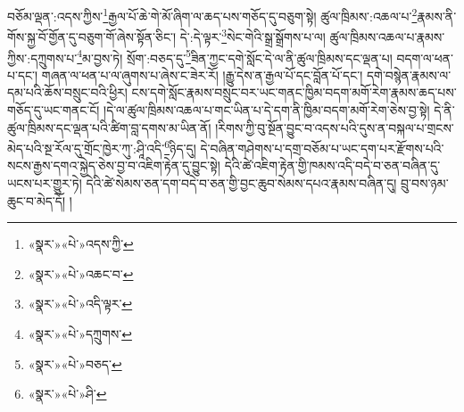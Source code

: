 བཅོམ་ལྡན་:འདས་ཀྱིས་\footnote{«སྣར་»«པེ་»འདས་ཀྱི་}རྒྱལ་པོ་ཆེ་གེ་མོ་ཞིག་ལ་ཆད་པས་གཅོད་དུ་བཅུག་སྟེ། ཚུལ་ཁྲིམས་:འཆལ་པ་\footnote{«སྣར་»«པེ་»འཆང་བ་}རྣམས་ནི་གོས་སྐྱ་བོ་གྱོན་དུ་བཅུག་གོ་ཞེས་སྟོན་ཅིང་། དེ་:དེ་ལྟར་\footnote{«སྣར་»«པེ་»འདི་ལྟར་}སེང་གེའི་སྒྲ་སྒྲོགས་པ་ལ། ཚུལ་ཁྲིམས་འཆལ་པ་རྣམས་ཀྱིས་:དཀྲུགས་པ་\footnote{«སྣར་»«པེ་»དཀྲུགས་}མ་བྱས་ཏེ། སྲོག་:བཅད་དུ་\footnote{«སྣར་»«པེ་»བཅད་}ཟིན་ཀྱང་དགེ་སློང་དེ་ལ་ནི་ཚུལ་ཁྲིམས་དང་ལྡན་པ། བདག་ལ་ཕན་པ་དང་། གཞན་ལ་ཕན་པ་ལ་ཞུགས་པ་ཞེས་ང་ཟེར་རོ། །རྒྱུ་དེས་ན་རྒྱལ་པོ་དང་བློན་པོ་དང་། དགེ་བསྙེན་རྣམས་ལ་དམ་པའི་ཆོས་བསྲུང་བའི་ཕྱིར། ངས་དགེ་སློང་རྣམས་བསྲུང་བར་ཡང་གནང་ཁྱིམ་བདག་མགོ་རེག་རྣམས་ཆད་པས་གཅོད་དུ་ཡང་གནང་ངོ། །དེ་ལ་ཚུལ་ཁྲིམས་འཆལ་པ་གང་ཡིན་པ་དེ་དག་ནི་ཁྱིམ་བདག་མགོ་རེག་ཅེས་བྱ་སྟེ། དེ་ནི་ཚུལ་ཁྲིམས་དང་ལྡན་པའི་ཚིག་བླ་དགས་མ་ཡིན་ནོ། །རིགས་ཀྱི་བུ་སྔོན་བྱུང་བ་འདས་པའི་དུས་ན་བསྐལ་པ་གྲངས་མེད་པའི་སྔ་རོལ་དུ་གྲོང་ཁྱེར་ཀུ་:ཤཱི་འདི་\footnote{«སྣར་»«པེ་»ཤི་}ཉིད་དུ། དེ་བཞིན་གཤེགས་པ་དགྲ་བཅོམ་པ་ཡང་དག་པར་རྫོགས་པའི་སངས་རྒྱས་དགའ་སྐྱེད་ཅེས་བྱ་བ་འཇིག་རྟེན་དུ་བྱུང་སྟེ། དེའི་ཚེ་འཇིག་རྟེན་གྱི་ཁམས་འདི་བདེ་བ་ཅན་བཞིན་དུ་ཡངས་པར་གྱུར་ཏེ། དེའི་ཚེ་སེམས་ཅན་དག་བདེ་བ་ཅན་གྱི་བྱང་ཆུབ་སེམས་དཔའ་རྣམས་བཞིན་དུ། བྲུ་བས་ཉམ་ཆུང་བ་མེད་དོ། །
